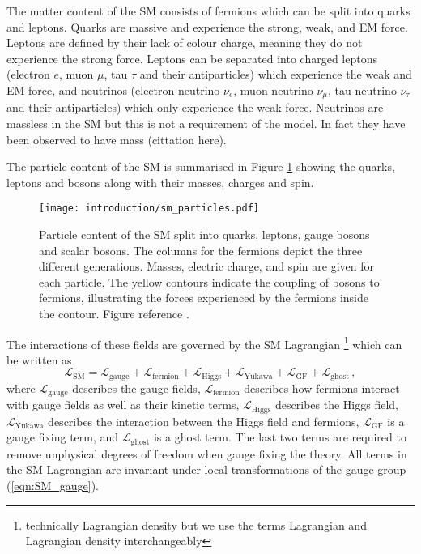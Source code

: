 \documentclass[main.tex]{subfiles}
\begin{document}
    The matter content of the SM consists of fermions which can be split
    into quarks and leptons. Quarks are massive and experience the strong,
    weak, and EM force. Leptons are defined by their lack of colour charge,
    meaning they do not experience the strong force. Leptons can be separated
    into charged leptons (electron $e$, muon $\mu$, tau $\tau$
    and their antiparticles) which experience the weak and EM force, and 
    neutrinos (electron neutrino $\nu_{e}$, muon neutrino $\nu_{\mu}$, tau
    neutrino $\nu_{\tau}$ and their antiparticles) which only experience the
    weak force. Neutrinos are massless in the SM but this is not a requirement
    of the model. In fact they have been observed to have mass (cittation here).

    The particle content of the SM is summarised in Figure \ref{fig:SM_particles}
    showing the quarks, leptons and bosons along with their masses, charges
    and spin.
    \begin{figure}
        \texttt{[image: introduction/sm\_particles.pdf]}
        \caption{Particle content of the SM split into quarks, leptons,
        gauge bosons and scalar bosons. The columns for the fermions depict
        the three different generations. Masses, electric charge, and spin
        are given for each particle. The yellow contours indicate the coupling
        of bosons to fermions, illustrating the forces experienced by the
        fermions inside the contour. Figure reference \cite{SM_figure}.}
        \label{fig:SM_particles}
    \end{figure}
    The interactions of these fields are governed by the SM Lagrangian
    \footnote{technically Lagrangian density but we use the terms
    Lagrangian and Lagrangian density interchangeably}
    which can be written as
    \begin{equation}\label{eqn:L_SM}
        \mathcal{L}_{\mathrm{SM}} = \mathcal{L}_{\mathrm{gauge}} + \mathcal{L}_{\mathrm{fermion}} + \mathcal{L}_{\mathrm{Higgs}} + \mathcal{L}_{\mathrm{Yukawa}} + \mathcal{L}_{\mathrm{GF}} + \mathcal{L}_{\mathrm{ghost}} \, ,
    \end{equation}
    where $\mathcal{L}_{\mathrm{gauge}}$ describes the gauge fields,
    $\mathcal{L}_{\mathrm{fermion}}$ describes how fermions interact with
    gauge fields as well as their kinetic terms,
    $\mathcal{L}_{\mathrm{Higgs}}$ describes the Higgs field,
    $\mathcal{L}_{\mathrm{Yukawa}}$ describes the interaction between the Higgs
    field and fermions,
    $\mathcal{L}_{\mathrm{GF}}$ is a gauge fixing term,
    and $\mathcal{L}_{\mathrm{ghost}}$ is a ghost term.
    The last two terms are required to remove unphysical degrees of freedom
    when gauge fixing the theory.
    All terms in the SM Lagrangian are invariant under local transformations
    of the gauge group (\ref{eqn:SM_gauge}).
\end{document}
